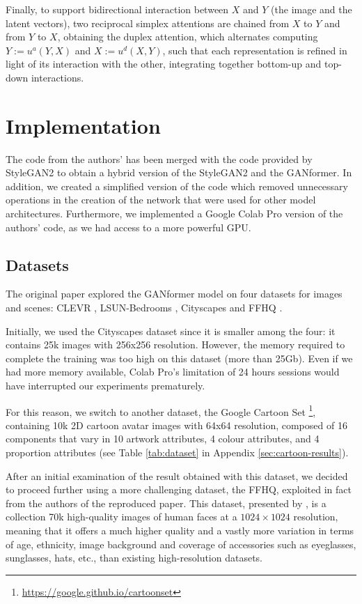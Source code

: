 \documentclass{article}
\begin{document}
Finally, to support bidirectional interaction between $X$ and $Y$ (the image and the latent vectors), 
two 
reciprocal simplex attentions are chained from $X$ to $Y$ and from $Y$ to $X$, obtaining the 
duplex 
attention, which alternates computing $Y :=u^a(Y,X)$ and $X:=u^d(X,Y)$, such that each 
representation is refined in light of its interaction with the other, integrating together bottom-up and 
top-down interactions.

\section{Implementation}
The code from the authors' has been merged with the code provided by StyleGAN2 to obtain a 
hybrid version of the StyleGAN2 and the GANformer. In addition, we created a simplified version of the code which removed unnecessary operations in the creation of the network that were used for other model architectures. Furthermore, we implemented a Google Colab Pro version of the authors’ code, as we had access to a more powerful GPU.

\subsection{Datasets}	\label{sec:dataset}
The original paper \cite{hudson2021generative} explored the GANformer model on four datasets for 
images and scenes: CLEVR \cite{johnson2017clevr}, LSUN-Bedrooms \cite{yu2015lsun}, Cityscapes 
\cite{cordts2016cityscapes} and FFHQ \cite{karras2019style}. 

Initially, we used the Cityscapes dataset since it is smaller among the four: it contains 
25k images with 256x256 resolution. 
However, the memory required to complete the training was too high on this dataset (more than 
25Gb).
Even if we had more memory available, Colab Pro's limitation of 24 hours sessions would have 
interrupted our experiments prematurely.

For this reason, we switch to another dataset, the Google Cartoon Set \cite{cartoonset}\footnote{	
	\url{https://google.github.io/cartoonset}}, containing 10k 2D cartoon avatar 
images with 64x64 resolution, composed of 16 components that vary in 10 artwork attributes, 4 
colour attributes, and 4 proportion attributes (see Table \ref{tab:dataset} in Appendix 
\ref{sec:cartoon-results}). 

After an initial examination of the result obtained with this dataset, we decided to proceed further using a more challenging dataset, the FFHQ, exploited in fact from the authors of the reproduced paper. 
This dataset, presented by \citet{karras2019style}, is a collection 70k high-quality images of human faces at a $1024\times1024$ resolution, meaning that it offers a much higher quality and a vastly more variation in terms of age, ethnicity, image background and coverage of accessories such as eyeglasses, sunglasses, hats, etc., than existing high-resolution datasets.
\end{document}
